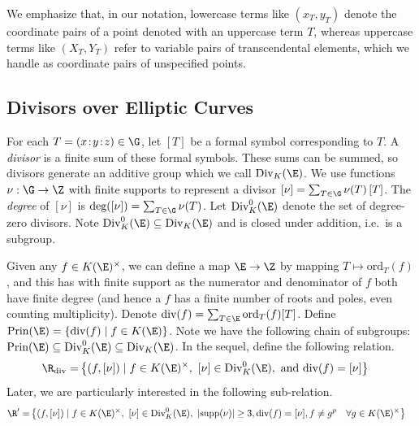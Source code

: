 \documentclass[11pt,letterpaper]{article}
\theoremstyle{definition}
\newcommand{\6}{\mathbf}
\newcommand{\7}{\mathcal}
\begin{document}
We emphasize that, in our notation, lowercase terms like $(x_T, y_T)$ denote the coordinate pairs of a point denoted with an uppercase term $T$, whereas uppercase terms like $(X_T, Y_T)$ refer to variable pairs of transcendental elements, which we handle as coordinate pairs of unspecified points.


\subsection{Divisors over Elliptic Curves}

For each $T = (x\!:\!y\!:\!z) \in \G$, let $\left[T\right]$ be a formal symbol corresponding to $T$. A \textit{divisor} is a finite sum of these formal symbols. These sums can be summed, so divisors generate an additive group which we call $\text{Div}_K(\E)$. We use functions $\nu: \G \to \Z$ with finite supports to represent a divisor $[\nu] = \sum_{T \in \G} \nu(T) \left[T\right]$. The \textit{degree} of $\left[\nu\right]$ is $\text{deg}(\left[\nu\right])=\sum_{T \in \G} \nu(T)$. 
Let $\text{Div}_{K}^0(\E)$ denote the set of degree-zero divisors. Note $\text{Div}_{K}^0(\E) \subseteq \text{Div}_K(\E)$ and is closed under addition, i.e.\ is a subgroup.

Given any $f \in K(\E)^\times$, we can define a map $\E \to \Z$  by mapping $T \mapsto \text{ord}_T(f)$, and this has with finite support as the numerator and denominator of $f$ both have finite degree (and hence a $f$ has a finite number of roots and poles, even counting multiplicity). Denote $\text{div}(f) = \sum_{T \in \E} \text{ord}_T(f)[T]$.  Define $\text{Prin}(\E) = \left\{\text{div}(f) \mid f \in K(\E)\right\}$. Note we have the following chain of subgroups: $\text{Prin}(\E) \subseteq \text{Div}_K^0(\E) \subseteq \text{Div}_K(\E)$. In the sequel, define the following relation.
\begin{align*}
\R_{\text{div}} =& \left\{(f, [\nu]) \mid f \in K(\E)^\times, \ [\nu] \in \text{Div}_K^0(\E), \text{ and } \text{div}(f) = [\nu]\right\} 
\end{align*}
Later, we are particularly interested in the following sub-relation.
\begin{align}
\R^\prime =& \left\{(f, [\nu]) \mid f \in K(\E)^\times, \ [\nu] \in \text{Div}_K^0(\E), \ \left|\text{supp}(\nu)\right| \geq 3, \text{div}(f) = [\nu],  f \neq g^p\quad\forall g \in K(\E)^\times\right\} \label{theRelation}
\end{align}
\end{document}
